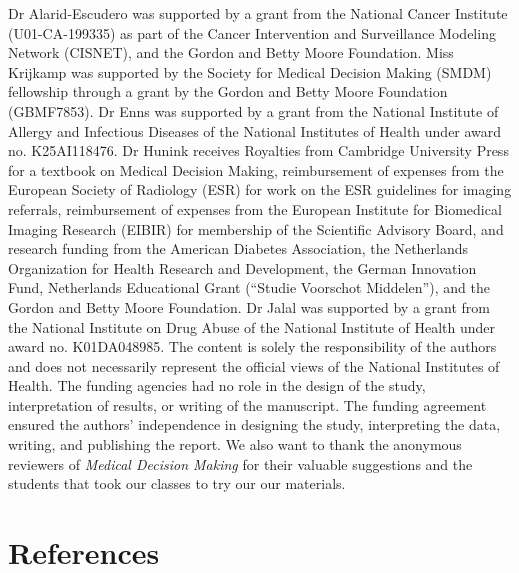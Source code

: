 \documentclass[
]{article}
\begin{document}
Dr Alarid-Escudero was supported by a grant from the National Cancer Institute (U01-CA-199335) as part of the Cancer Intervention and Surveillance Modeling Network (CISNET), and the Gordon and Betty Moore Foundation. Miss Krijkamp was supported by the Society for Medical Decision Making (SMDM) fellowship through a grant by the Gordon and Betty Moore Foundation (GBMF7853). Dr Enns was supported by a grant from the National Institute of Allergy and Infectious Diseases of the National Institutes of Health under award no. K25AI118476. Dr Hunink receives Royalties from Cambridge University Press for a textbook on Medical Decision Making, reimbursement of expenses from the European Society of Radiology (ESR) for work on the ESR guidelines for imaging referrals, reimbursement of expenses from the European Institute for Biomedical Imaging Research (EIBIR) for membership of the Scientific Advisory Board, and research funding from the American Diabetes Association, the Netherlands Organization for Health Research and Development, the German Innovation Fund, Netherlands Educational Grant (``Studie Voorschot Middelen''), and the Gordon and Betty Moore Foundation. Dr Jalal was supported by a grant from the National Institute on Drug Abuse of the National Institute of Health under award no. K01DA048985. The content is solely the responsibility of the authors and does not necessarily represent the official views of the National Institutes of Health. The funding agencies had no role in the design of the study, interpretation of results, or writing of the manuscript. The funding agreement ensured the authors' independence in designing the study, interpreting the data, writing, and publishing the report. We also want to thank the anonymous reviewers of \emph{Medical Decision Making} for their valuable suggestions and the students that took our classes to try our our materials.

\hypertarget{references}{%
\section*{References}\label{references}}
\end{document}
